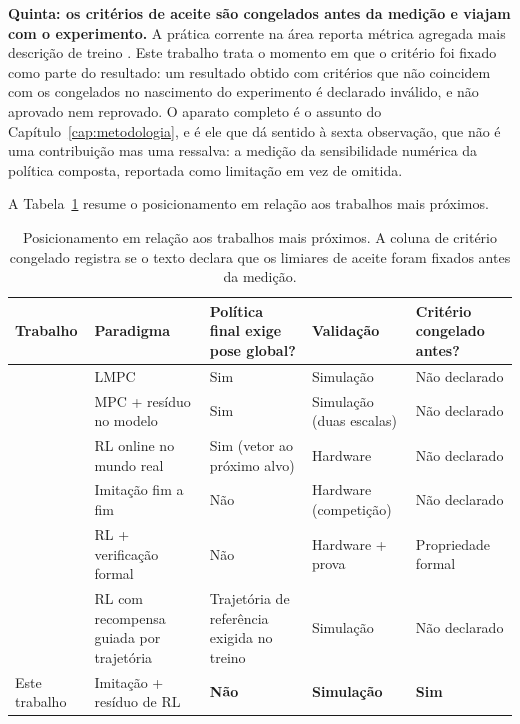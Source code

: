 \textbf{Quinta: os critérios de aceite são congelados antes da medição e viajam
com o experimento.} A prática corrente na área reporta métrica agregada mais
descrição de treino \cite{Betz2022Survey}. Este trabalho trata o momento em que o
critério foi fixado como parte do resultado: um resultado obtido com critérios
que não coincidem com os congelados no nascimento do experimento é declarado
inválido, e não aprovado nem reprovado. O aparato completo é o assunto do
Capítulo~\ref{cap:metodologia}, e é ele que dá sentido à sexta observação, que
não é uma contribuição mas uma ressalva: a medição da sensibilidade numérica da
política composta, reportada como limitação em vez de omitida.

A Tabela~\ref{tab:arte_posicionamento} resume o posicionamento em relação aos
trabalhos mais próximos.

\begin{table}[htb]
    \centering
    \small
    \begin{tabular}{|p{3.1cm}|p{2.3cm}|p{2.6cm}|p{2.2cm}|p{2.4cm}|}
        \hline
        \textbf{Trabalho} & \textbf{Paradigma} & \textbf{Política final exige pose global?} &
        \textbf{Validação} & \textbf{Critério congelado antes?} \\
        \hline
        \cite{Wang2020LMPC} & LMPC & Sim & Simulação & Não declarado \\
        \hline
        \cite{Jain2020Bayesrace} & MPC + resíduo no modelo & Sim & Simulação (duas escalas) & Não declarado \\
        \hline
        \cite{Stachowicz2023FastRLAP} & RL online no mundo real & Sim (vetor ao próximo alvo) & Hardware & Não declarado \\
        \hline
        \cite{Zarrar2024TinyLidarNet} & Imitação fim a fim & Não & Hardware (competição) & Não declarado \\
        \hline
        \cite{Ivanov2020Verifying} & RL + verificação formal & Não & Hardware + prova & Propriedade formal \\
        \hline
        \cite{Evans2023Trajectory} & RL com recompensa guiada por trajetória & Trajetória de referência exigida no treino & Simulação & Não declarado \\
        \hline
        Este trabalho & Imitação + resíduo de RL & \textbf{Não} & \textbf{Simulação} & \textbf{Sim} \\
        \hline
    \end{tabular}
    \caption{Posicionamento em relação aos trabalhos mais próximos. A coluna de
    critério congelado registra se o texto declara que os limiares de aceite
    foram fixados antes da medição.}
    \label{tab:arte_posicionamento}
\end{table}

